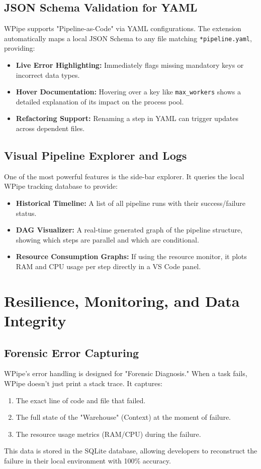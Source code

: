 \documentclass[12pt,a4paper]{report}
\begin{document}
\cleardoublepage
\section{JSON Schema Validation for YAML}
WPipe supports "Pipeline-as-Code" via YAML configurations. The extension automatically maps a local JSON Schema to any file matching \texttt{*pipeline.yaml}, providing:
\begin{itemize}
    \item \textbf{Live Error Highlighting:} Immediately flags missing mandatory keys or incorrect data types.
    \item \textbf{Hover Documentation:} Hovering over a key like \texttt{max\_workers} shows a detailed explanation of its impact on the process pool.
    \item \textbf{Refactoring Support:} Renaming a step in YAML can trigger updates across dependent files.
\end{itemize}

\section{Visual Pipeline Explorer and Logs}
One of the most powerful features is the side-bar explorer. It queries the local WPipe tracking database to provide:
\begin{itemize}
    \item \textbf{Historical Timeline:} A list of all pipeline runs with their success/failure status.
    \item \textbf{DAG Visualizer:} A real-time generated graph of the pipeline structure, showing which steps are parallel and which are conditional.
    \item \textbf{Resource Consumption Graphs:} If using the resource monitor, it plots RAM and CPU usage per step directly in a VS Code panel.
\end{itemize}

\chapter{Resilience, Monitoring, and Data Integrity}
\cleardoublepage

\section{Forensic Error Capturing}
WPipe's error handling is designed for "Forensic Diagnosis." When a task fails, WPipe doesn't just print a stack trace. It captures:
\begin{enumerate}
    \item The exact line of code and file that failed.
    \item The full state of the "Warehouse" (Context) at the moment of failure.
    \item The resource usage metrics (RAM/CPU) during the failure.
\end{enumerate}
This data is stored in the SQLite database, allowing developers to reconstruct the failure in their local environment with 100\% accuracy.
\end{document}
